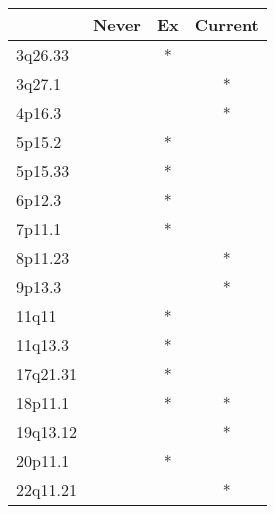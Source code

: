 \begin{tabular}{lccc}
\toprule
{} & Never & Ex & Current \\
\midrule
3q26.33  &       &  * &         \\
3q27.1   &       &    &       * \\
4p16.3   &       &    &       * \\
5p15.2   &       &  * &         \\
5p15.33  &       &  * &         \\
6p12.3   &       &  * &         \\
7p11.1   &       &  * &         \\
8p11.23  &       &    &       * \\
9p13.3   &       &    &       * \\
11q11    &       &  * &         \\
11q13.3  &       &  * &         \\
17q21.31 &       &  * &         \\
18p11.1  &       &  * &       * \\
19q13.12 &       &    &       * \\
20p11.1  &       &  * &         \\
22q11.21 &       &    &       * \\
\bottomrule
\end{tabular}
